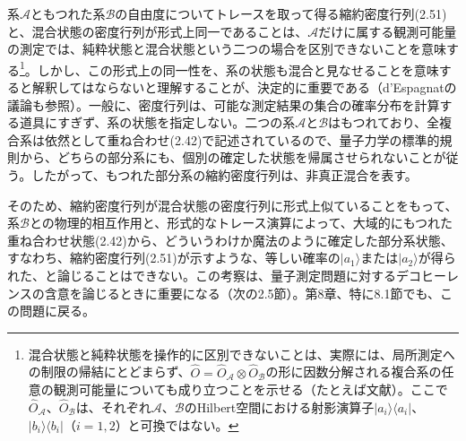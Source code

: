 系$\mathcal A$ともつれた系$\mathcal B$の自由度についてトレースを取って得る縮約密度行列(2.51)と、混合状態の密度行列が形式上同一であることは、$\mathcal A$だけに属する観測可能量の測定では、純粋状態と混合状態という二つの場合を区別できないことを意味する\footnote{混合状態と純粋状態を操作的に区別できないことは、実際には、局所測定への制限の帰結にとどまらず、$\hat O=\hat O_{\mathcal A}\otimes\hat O_{\mathcal B}$の形に因数分解される複合系の任意の観測可能量についても成り立つことを示せる（たとえば文献\cite[pp.~208--210]{ref068}）。ここで$\hat O_{\mathcal A}$、$\hat O_{\mathcal B}$は、それぞれ$\mathcal A$、$\mathcal B$のHilbert空間における射影演算子$\lvert a_i\rangle\langle a_i\rvert$、$\lvert b_i\rangle\langle b_i\rvert$（$i=1,2$）と可換ではない。}。しかし、この形式上の同一性を、系の状態も混合と見なせることを意味すると解釈してはならないと理解することが、決定的に重要である（d'Espagnatの議論\cite{ref047,ref048,ref049}も参照）。一般に、密度行列は、可能な測定結果の集合の確率分布を計算する道具にすぎず、系の状態を指定しない。二つの系$\mathcal A$と$\mathcal B$はもつれており、全複合系は依然として重ね合わせ(2.42)で記述されているので、量子力学の標準的規則から、どちらの部分系にも、個別の確定した状態を帰属させられないことが従う。したがって、もつれた部分系の縮約密度行列は、非真正混合を表す\cite{ref047,ref048,ref049}。

\hypertarget{srcpage:49}{}\label{srcpage:49}
そのため、縮約密度行列が混合状態の密度行列に形式上似ていることをもって、系$\mathcal B$との物理的相互作用と、形式的なトレース演算によって、大域的にもつれた重ね合わせ状態(2.42)から、どういうわけか魔法のように確定した部分系状態、すなわち、縮約密度行列(2.51)が示すような、等しい確率の$\lvert a_1\rangle$または$\lvert a_2\rangle$が得られた、と論じることはできない。この考察は、量子測定問題に対するデコヒーレンスの含意を論じるときに重要になる（次の2.5節）。第8章、特に8.1節でも、この問題に戻る。
